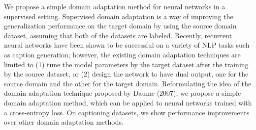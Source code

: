 We propose a simple domain adaptation method for neural networks in a supervised setting. Supervised domain adaptation is a way of improving the generalization performance on the target domain by using the source domain dataset, assuming that both of the datasets are labeled. Recently, recurrent neural networks have been shown to be successful on a variety of NLP tasks such as caption generation; however, the existing domain adaptation techniques are limited to (1) tune the model parameters by the target dataset after the training by the source dataset, or (2) design the network to have dual output, one for the source domain and the other for the target domain. Reformulating the idea of the domain adaptation technique proposed by Daume (2007), we propose a simple domain adaptation method, which can be applied to neural networks trained with a cross-entropy loss. On captioning datasets, we show performance improvements over other domain adaptation methods.
